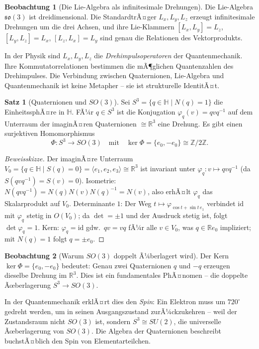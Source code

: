 ﻿\documentclass[a4paper,12pt]{report}
\theoremstyle{definition}
\newtheorem{satz}{Satz}
\newtheorem{beobachtung}{Beobachtung}
\begin{document}
\begin{beobachtung}[Die Lie-Algebra als infinitesimale Drehungen]
    Die Lie-Algebra $\mathfrak{so}(3)$ ist dreidimensional. Die StandardtrÃ¤ger
    $L_x, L_y, L_z$ erzeugt infinitesimale Drehungen um die drei Achsen,
    und ihre Lie-Klammern $[L_x, L_y] = L_z$, $[L_y, L_z] = L_x$,
    $[L_z, L_x] = L_y$ sind genau die Relationen des Vektorprodukts.

    In der Physik sind $L_x, L_y, L_z$ die \emph{Drehimpulsoperatoren}
    der Quantenmechanik. Ihre Kommutatorrelationen bestimmen die mÃ¶glichen
    Quantenzahlen des Drehimpulses. Die Verbindung zwischen Quaternionen,
    Lie-Algebra und Quantenmechanik ist keine Metapher -- sie ist
    strukturelle IdentitÃ¤t.
\end{beobachtung}

\begin{satz}[Quaternionen und \texorpdfstring{$SO(3)$}{SO(3)}]
    Sei $S^3 = \{q \in \mathbb{H} \mid N(q) = 1\}$ die EinheitssphÃ¤re
    in $\mathbb{H}$. FÃ¼r $q \in S^3$ ist die Konjugation
    $\varphi_q(v) = q v q^{-1}$ auf dem Unterraum der imaginÃ¤ren
    Quaternionen $\cong \mathbb{R}^3$ eine Drehung. Es gibt einen
    surjektiven Homomorphismus
    \[
        \Phi : S^3 \longrightarrow SO(3) \quad \text{mit} \quad
        \ker \Phi = \{e_0, -e_0\} \cong \mathbb{Z}/2\mathbb{Z}.
    \]
\end{satz}
\begin{proof}[Beweisskizze]
    Der imaginÃ¤re Unterraum $V_0 = \{q \in \mathbb{H} \mid S(q) = 0\}
    = \langle e_1, e_2, e_3 \rangle \cong \mathbb{R}^3$ ist invariant unter
    $\varphi_q : v \mapsto qvq^{-1}$ (da $S(qvq^{-1}) = S(v) = 0$).
    Isometrie: $N(qvq^{-1}) = N(q)N(v)N(q)^{-1} = N(v)$, also erhÃ¤lt
    $\varphi_q$ das Skalarprodukt auf $V_0$. Determinante $1$: Der Weg
    $t \mapsto \varphi_{\cos t + \sin t \, e_1}$ verbindet $\mathrm{id}$ mit
    $\varphi_q$ stetig in $O(V_0)$; da $\det = \pm 1$ und der Ausdruck
    stetig ist, folgt $\det \varphi_q = 1$.
    Kern: $\varphi_q = \mathrm{id}$ gdw.\ $qv = vq$ fÃ¼r alle $v \in V_0$,
    was $q \in \mathbb{R} e_0$ impliziert; mit $N(q) = 1$ folgt $q = \pm e_0$.
\end{proof}


\begin{beobachtung}[Warum \texorpdfstring{$SO(3)$}{SO(3)} doppelt Ã¼berlagert wird]
    Der Kern $\ker \Phi = \{e_0, -e_0\}$ bedeutet: Genau zwei Quaternionen
    $q$ und $-q$ erzeugen dieselbe Drehung im $\mathbb{R}^3$. Dies ist
    ein fundamentales PhÃ¤nomen -- die doppelte Ãœberlagerung $S^3 \to SO(3)$.

    In der Quantenmechanik erklÃ¤rt dies den \emph{Spin}: Ein Elektron
    muss um $720^\circ$ gedreht werden, um in seinen Ausgangszustand
    zurÃ¼ckzukehren -- weil der Zustandsraum nicht $SO(3)$ ist, sondern
    $S^3 \cong SU(2)$, die universelle Ãœberlagerung von $SO(3)$.
    Die Algebra der Quaternionen beschreibt buchstÃ¤blich den Spin
    von Elementarteilchen.
\end{beobachtung}
\end{document}
